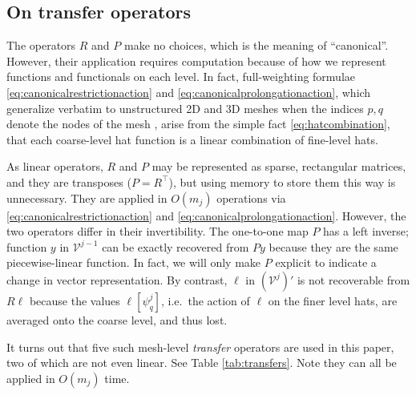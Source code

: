 \documentclass[letterpaper,final,12pt,reqno]{amsart}
\theoremstyle{claim}
\numberwithin{equation}{section}
\numberwithin{figure}{section}
\numberwithin{table}{section}
\numberwithin{theorem}{section}
\begin{document}
\subsection{On transfer operators} \label{subsec:transfers}  The operators $R$ and $P$ make no choices, which is the meaning of ``canonical''.  However, their application requires computation because of how we represent functions and functionals on each level.  In fact, full-weighting formulae \eqref{eq:canonicalrestrictionaction} and \eqref{eq:canonicalprolongationaction}, which generalize verbatim to unstructured 2D and 3D meshes when the indices $p,q$ denote the nodes of the mesh \cite[Chapter V]{Braess2007}, arise from the simple fact \eqref{eq:hatcombination}, that each coarse-level hat function is a linear combination of fine-level hats.

As linear operators, $R$ and $P$ may be represented as sparse, rectangular matrices, and they are transposes ($P=R^\top$), but using memory to store them this way is unnecessary.  They are applied in $O(m_j)$ operations via \eqref{eq:canonicalrestrictionaction} and \eqref{eq:canonicalprolongationaction}.  However, the two operators differ in their invertibility.  The one-to-one map $P$ has a left inverse; function $y$ in $\mathcal{V}^{j-1}$ can be exactly recovered from $Py$ because they are the same piecewise-linear function.  In fact, we will only make $P$ explicit to indicate a change in vector representation.  By contrast, $\ell$ in $(\mathcal{V}^j)'$ is not recoverable from $R\ell$ because the values $\ell[\psi_q^j]$, i.e.~the action of $\ell$ on the finer level hats, are averaged onto the coarse level, and thus lost.

It turns out that five such mesh-level \emph{transfer} operators are used in this paper, two of which are not even linear.  See Table \ref{tab:transfers}.  Note they can all be applied in $O(m_j)$ time.
\end{document}

